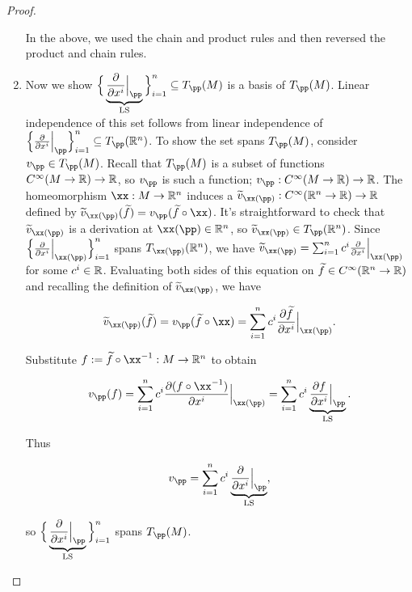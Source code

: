 \begin{proof}
\begin{enumerate}
        In the above, we used the chain and product rules and then reversed the product and chain rules.

        \item Now we show $\Big\{ \pdxiLS \Big\}_{i = 1}^n \subseteq T_\pp(M)$ is a basis of $T_\pp(M)$. Linear independence of this set follows from linear independence of $\Big\{ \frac{\pd}{\pd x^i}\Big|_\pp \Big\}_{i = 1}^n \subseteq T_\pp(\R^n)$. To show the set spans $T_\pp(M)$, consider $v_\pp \in T_\pp(M)$. Recall that $T_\pp(M)$ is a subset of functions $C^\infty(M \rightarrow \mathbb{R}) \rightarrow \mathbb{R}$, so $v_\pp$ is such a function; $v_\pp:C^\infty(M \rightarrow \R) \rightarrow \R$. The homeomorphism $\xx:M \rightarrow \R^n$ induces a $\widetilde{v}_{\xx(\pp)}:C^\infty(\R^n \rightarrow \R) \rightarrow \R$ defined by $\widetilde{v}_{\xx(\pp)}(\tf) = v_\pp(\tf \circ \xx)$. It's straightforward to check that $\widetilde{v}_{\xx(\pp)}$ is a derivation at $\xx(\pp) \in \R^n$, so $\widetilde{v}_{\xx(\pp)} \in T_\pp(\R^n)$. Since $\Big\{ \frac{\pd}{\pd x^i}\Big|_{\xx(\pp)} \Big\}_{i = 1}^n$ spans $T_{\xx(\pp)}(\R^n)$, we have $\widetilde{v}_{\xx(\pp)} = \sum_{i = 1}^n c^i \frac{\pd}{\pd x^i}\Big|_{\xx(\pp)}$ for some $c^i \in \mathbb{R}$. Evaluating both sides of this equation on $\widetilde{f} \in C^\infty(\mathbb{R}^n \rightarrow \mathbb{R})$ and recalling the definition of $\widetilde{v}_{\xx(\pp)}$, we have

        \begin{align*}
            \widetilde{v}_{\xx(\pp)}(\tf) = v_\pp(\tf \circ \xx) = \sum_{i = 1}^n c^i \frac{\pd \tf}{\pd x^i}\Big|_{\xx(\pp)}.
        \end{align*}
    
        Substitute $f := \tf \circ \xx^{-1}:M \rightarrow \R^n$ to obtain
    
        \begin{align*}
            v_\pp(f) = \sum_{i = 1}^n c^i \frac{\pd (f \circ \xx^{-1})}{\pd x^i}\Big|_{\xx(\pp)} = \sum_{i = 1}^n c^i \underbrace{\frac{\pd f}{\pd x^i}\Big|_\pp}_{\text{LS}}.
        \end{align*}
    
        Thus
    
        \begin{align*}
            v_\pp = \sum_{i = 1}^n c^i \pdxiLS,
        \end{align*}
        
        so $\Big\{ \pdxiLS \Big\}_{i = 1}^n$ spans $T_\pp(M)$.
    \end{enumerate} 
\end{proof}

